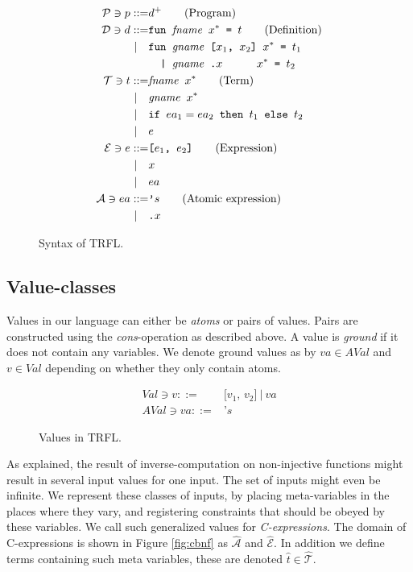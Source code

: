 \documentclass[10pt]{../sigplanconf}
\begin{document}
\begin{figure}\centering
  \begin{align*}
    \mathcal{P} \ni p ::= & d^{+}\tag{Program}\\
    \mathcal{D} \ni d ::= &\texttt{fun \textit{\rmfamily fname} $x^{*}$ = $t$}  \tag{Definition} \\
    | \quad &\texttt{fun \textit{\rmfamily gname} [$x_1$, $x_2$] $x^{*}$ = $t_1$} \\
    & \texttt{\ \ | \textit{\rmfamily gname}\ \texttt{.}$x$ \hspace{.7cm} $x^{*}$ = $t_2$}\\
    \mathcal{T} \ni t ::= & \texttt{\textit{\rmfamily fname} $x^{*}$}  \tag{Term}\\
    | \quad & \texttt{\textit{\rmfamily gname} $x^{*}$} \\
    | \quad & \texttt{if $ea_1 = ea_2$ then $t_1$ else $t_2$} \\
    | \quad & e \\
    \mathcal{E} \ni e ::= & \texttt{[$e_1$, $e_2$]} \tag{Expression}\\
    | \quad & x \\
    | \quad & ea \\
    \mathcal{A} \ni ea ::= & \texttt{'}s \tag{Atomic expression}\\
    | \quad & \texttt{.}x
  \end{align*}
  \caption{Syntax of TRFL.}
\label{fig:bnf}
\end{figure}

\subsection{Value-classes}
Values in our language can either be \textit{atoms} or pairs of
values. Pairs are constructed using the \textit{cons}-operation as
described above. A value is \textit{ground} if it does not contain any
variables. We denote ground values as by $va \in AVal$ and $v \in Val$
depending on whether they only contain atoms.

\begin{figure}\centering
  \begin{align*}
    Val \ni v ::= & \texttt{[$v_1$, $v_2$]}\ |\ va\\
    AVal \ni va ::= & \texttt{'}s
  \end{align*}
  \caption{Values in TRFL.}
\label{fig:bnf}
\end{figure}

As explained, the result of inverse-computation on non-injective
functions might result in several input values for one input. The set
of inputs might even be infinite. We represent these classes of
inputs, by placing meta-variables in the places where they vary, and
registering constraints that should be obeyed by these variables.  We
call such generalized values for \textit{C-expressions}. The domain of
C-expressions is shown in Figure \ref{fig:cbnf} as
$\mathcal{\widehat{A}}$ and $\mathcal{\widehat{E}}$. In addition we
define terms containing such meta variables, these are denoted
$\widehat{t} \in \widehat{\mathcal{T}}$.
\end{document}
